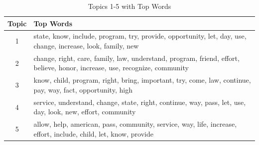 \begin{table}[htbp]
\centering
\caption{Topics 1-5 with Top Words}
\begin{tabular}{cl}
\toprule
Topic & Top Words \\
\midrule
1 & state, know, include, program, try, provide, opportunity, let, day, use, change, increase, look, family, new \\
2 & change, right, care, family, law, understand, program, friend, effort, believe, honor, increase, use, recognize, community \\
3 & know, child, program, right, bring, important, try, come, law, continue, pay, way, fact, opportunity, high \\
4 & service, understand, change, state, right, continue, way, pass, let, use, day, look, new, effort, community \\
5 & allow, help, american, pass, community, service, way, life, increase, effort, include, child, let, know, provide \\
\bottomrule
\end{tabular}
\end{table}
